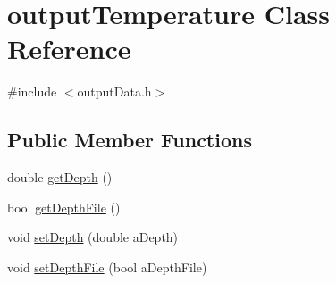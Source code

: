 \hypertarget{classoutput_temperature}{
\section{outputTemperature Class Reference}
\label{classoutput_temperature}
}


{\ttfamily \#include $<$outputData.h$>$}\subsection*{Public Member Functions}
\begin{DoxyCompactItemize}
\item 
double \hyperlink{classoutput_temperature_ae4591f00483c677d20ba6f8bb980e7c0}{getDepth} ()
\item 
bool \hyperlink{classoutput_temperature_a08778008ebcaaa296095048d92075d18}{getDepthFile} ()
\item 
void \hyperlink{classoutput_temperature_ad59e59b683f9bd59644bb7dc82ac3043}{setDepth} (double aDepth)
\item 
void \hyperlink{classoutput_temperature_a7abf127444c75e7b4a175b1fc2e67e97}{setDepthFile} (bool aDepthFile)
\end{DoxyCompactItemize}



